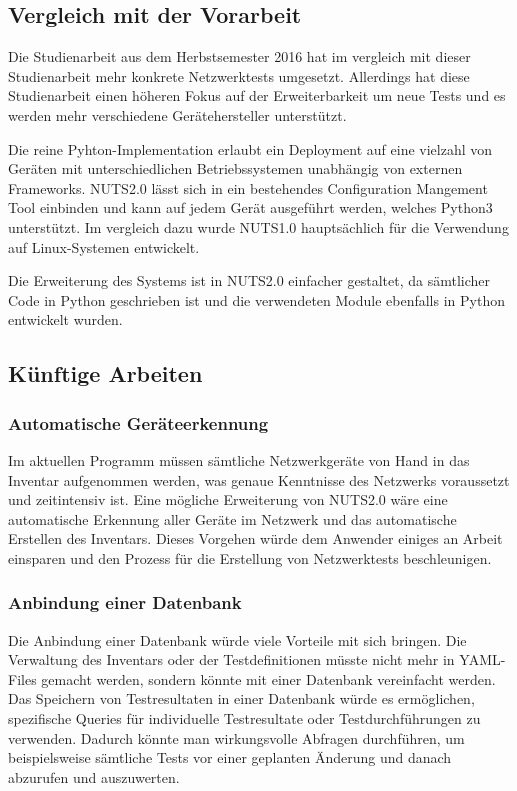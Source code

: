 \documentclass[]{subfiles}
\begin{document}
\newpage

\subsection{Vergleich mit der Vorarbeit}
Die Studienarbeit aus dem Herbstsemester 2016 hat im vergleich mit dieser Studienarbeit
mehr konkrete Netzwerktests umgesetzt. 
Allerdings hat diese Studienarbeit einen höheren Fokus auf der Erweiterbarkeit um neue
Tests und es werden mehr verschiedene Gerätehersteller unterstützt.

Die reine Pyhton-Implementation erlaubt ein Deployment auf eine vielzahl von Geräten 
mit unterschiedlichen Betriebssystemen unabhängig von externen Frameworks.
NUTS2.0 lässt sich in ein bestehendes Configuration Mangement Tool einbinden und kann
auf jedem Gerät ausgeführt werden, welches Python3 unterstützt.
Im vergleich dazu wurde NUTS1.0 hauptsächlich für die Verwendung auf Linux-Systemen entwickelt.

Die Erweiterung des Systems ist in NUTS2.0 einfacher gestaltet, da sämtlicher Code in 
Python geschrieben ist und die verwendeten Module ebenfalls in Python entwickelt wurden.

\newpage




\subsection{Künftige Arbeiten}
\label{subsec:Künftige Arbeiten}
\subsubsection*{Automatische Geräteerkennung}
Im aktuellen Programm müssen sämtliche Netzwerkgeräte von Hand in das Inventar aufgenommen
werden, was genaue Kenntnisse des Netzwerks voraussetzt und zeitintensiv ist.
Eine mögliche Erweiterung von NUTS2.0 wäre eine automatische Erkennung aller Geräte im 
Netzwerk und das automatische Erstellen des Inventars.
Dieses Vorgehen würde dem Anwender einiges an Arbeit einsparen und den Prozess für die 
Erstellung von Netzwerktests beschleunigen.

\subsubsection*{Anbindung einer Datenbank}
Die Anbindung einer Datenbank würde viele Vorteile mit sich bringen.
Die Verwaltung des Inventars oder der Testdefinitionen müsste nicht mehr in YAML-Files 
gemacht werden, sondern könnte mit einer Datenbank vereinfacht werden.
Das Speichern von Testresultaten in einer Datenbank würde es ermöglichen, 
spezifische Queries für individuelle Testresultate oder Testdurchführungen zu verwenden.
Dadurch könnte man wirkungsvolle Abfragen durchführen, um beispielsweise sämtliche 
Tests vor einer geplanten Änderung und danach abzurufen und auszuwerten.
\end{document}
